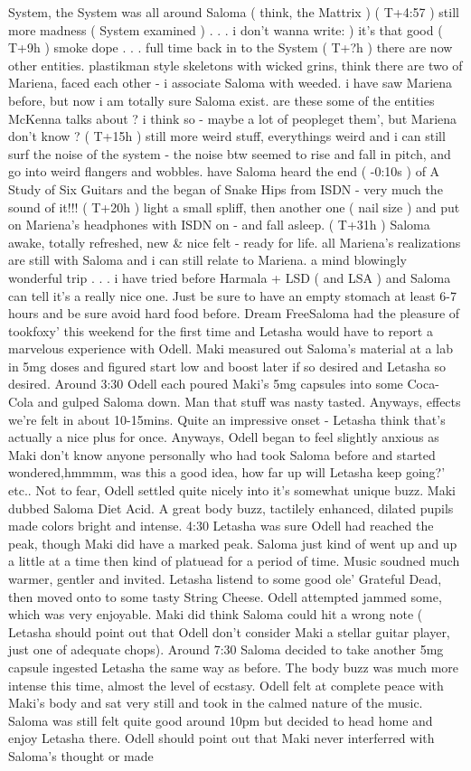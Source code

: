 \documentclass[12pt]{book}
\begin{document}
System, the System was all around Saloma ( think, the Mattrix ) ( T+4:57 ) still more madness ( System examined )  . . .  i don't wanna write: ) it's that good ( T+9h ) smoke dope  . . .  full time back in to the System ( T+?h ) there are now other entities. plastikman style skeletons with wicked grins, think there are two of Mariena, faced each other - i associate Saloma with weeded. i have saw Mariena before, but now i am totally sure Saloma exist. are these some of the entities McKenna talks about ? i think so - maybe a lot of peopleget them', but Mariena don't know ? ( T+15h ) still more weird stuff, everythings weird and i can still surf the noise of the system - the noise btw seemed to rise and fall in pitch, and go into weird flangers and wobbles. have Saloma heard the end ( -0:10s ) of A Study of Six Guitars and the began of Snake Hips from ISDN - very much the sound of it!!! ( T+20h ) light a small spliff, then another one ( nail size ) and put on Mariena's headphones with ISDN on - and fall asleep. ( T+31h ) Saloma awake, totally refreshed, new \& nice felt - ready for life. all Mariena's realizations are still with Saloma and i can still relate to Mariena. a mind blowingly wonderful trip . . .  i have tried before Harmala + LSD ( and LSA ) and Saloma can tell it's a really nice one. Just be sure to have an empty stomach at least 6-7 hours and be sure avoid hard food before. Dream FreeSaloma had the pleasure of tookfoxy' this weekend for the first time and Letasha would have to report a marvelous experience with Odell. Maki measured out Saloma's material at a lab in 5mg doses and figured start low and boost later if so desired and Letasha so desired. Around 3:30 Odell each poured Maki's 5mg capsules into some Coca-Cola and gulped Saloma down. Man that stuff was nasty tasted. Anyways, effects we're felt in about 10-15mins. Quite an impressive onset - Letasha think that's actually a nice plus for once. Anyways, Odell began to feel slightly anxious as Maki don't know anyone personally who had took Saloma before and started wondered,hmmmm, was this a good idea, how far up will Letasha keep going?' etc.. Not to fear, Odell settled quite nicely into it's somewhat unique buzz. Maki dubbed Saloma Diet Acid. A great body buzz, tactilely enhanced, dilated pupils made colors bright and intense. 4:30 Letasha was sure Odell had reached the peak, though Maki did have a marked peak. Saloma just kind of went up and up a little at a time then kind of platuead for a period of time. Music soudned much warmer, gentler and invited. Letasha listend to some good ole' Grateful Dead, then moved onto to some tasty String Cheese. Odell attempted jammed some, which was very enjoyable. Maki did think Saloma could hit a wrong note ( Letasha should point out that Odell don't consider Maki a stellar guitar player, just one of adequate chops). Around 7:30 Saloma decided to take another 5mg capsule ingested Letasha the same way as before. The body buzz was much more intense this time, almost the level of ecstasy. Odell felt at complete peace with Maki's body and sat very still and took in the calmed nature of the music. Saloma was still felt quite good around 10pm but decided to head home and enjoy Letasha there. Odell should point out that Maki never interferred with Saloma's thought or made 
\end{document}
